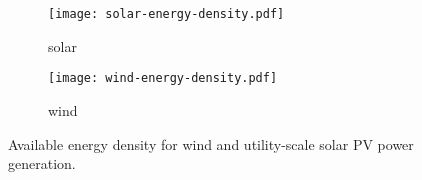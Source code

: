 
\begin{figure}
    \centering
    \begin{subfigure}[t]{0.49\textwidth}
        \centering
        \caption{solar}
        \texttt{[image: solar-energy-density.pdf]}
    \end{subfigure}
    \begin{subfigure}[t]{0.49\textwidth}
        \centering
        \caption{wind}
        \texttt{[image: wind-energy-density.pdf]}
    \end{subfigure}
    \caption{Available energy density for wind and utility-scale solar PV power generation.}
    \label{fig:energy-density}
\end{figure}

